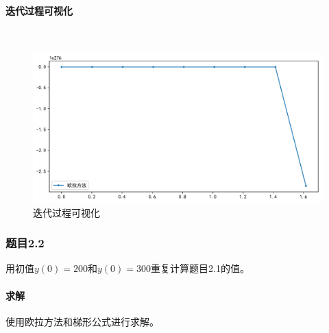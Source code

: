 \paragraph{迭代过程可视化}
~\\
\begin{figure}[H]
	\centering
	\caption{迭代过程可视化}
	\includegraphics[width=\linewidth]{fig31.pdf}
\end{figure}

\subsubsection{题目2.2}

用初值$y(0)=200$和$y(0)=300$重复计算题目2.1的值。

\paragraph{求解} 使用欧拉方法和梯形公式进行求解。

